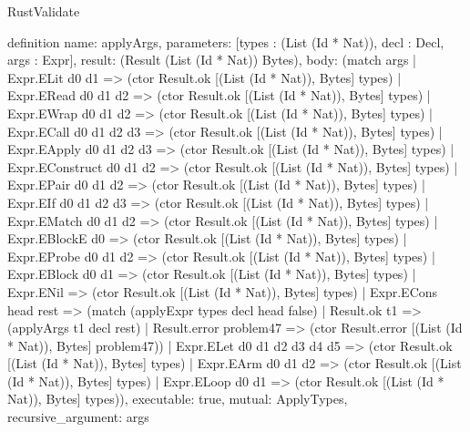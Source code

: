 \begin{lexlean}{RustValidate}
\begin{semanticmodule}
definition{
  name: applyArgs,
  parameters: [types : (List (Id * Nat)), decl : Decl, args : Expr],
  result: (Result (List (Id * Nat)) Bytes),
  body: (match args
    | Expr.ELit d0 d1 => (ctor Result.ok [(List (Id * Nat)), Bytes] types)
    | Expr.ERead d0 d1 d2 => (ctor Result.ok [(List (Id * Nat)), Bytes] types)
    | Expr.EWrap d0 d1 d2 => (ctor Result.ok [(List (Id * Nat)), Bytes] types)
    | Expr.ECall d0 d1 d2 d3 => (ctor Result.ok [(List (Id * Nat)), Bytes] types)
    | Expr.EApply d0 d1 d2 d3 => (ctor Result.ok [(List (Id * Nat)), Bytes] types)
    | Expr.EConstruct d0 d1 d2 => (ctor Result.ok [(List (Id * Nat)), Bytes] types)
    | Expr.EPair d0 d1 d2 => (ctor Result.ok [(List (Id * Nat)), Bytes] types)
    | Expr.EIf d0 d1 d2 d3 => (ctor Result.ok [(List (Id * Nat)), Bytes] types)
    | Expr.EMatch d0 d1 d2 => (ctor Result.ok [(List (Id * Nat)), Bytes] types)
    | Expr.EBlockE d0 => (ctor Result.ok [(List (Id * Nat)), Bytes] types)
    | Expr.EProbe d0 d1 d2 => (ctor Result.ok [(List (Id * Nat)), Bytes] types)
    | Expr.EBlock d0 d1 => (ctor Result.ok [(List (Id * Nat)), Bytes] types)
    | Expr.ENil => (ctor Result.ok [(List (Id * Nat)), Bytes] types)
    | Expr.ECons head rest => (match (applyExpr types decl head false)
      | Result.ok t1 => (applyArgs t1 decl rest)
      | Result.error problem47 => (ctor Result.error [(List (Id * Nat)), Bytes] problem47))
    | Expr.ELet d0 d1 d2 d3 d4 d5 => (ctor Result.ok [(List (Id * Nat)), Bytes] types)
    | Expr.EArm d0 d1 d2 => (ctor Result.ok [(List (Id * Nat)), Bytes] types)
    | Expr.ELoop d0 d1 => (ctor Result.ok [(List (Id * Nat)), Bytes] types)),
  executable: true,
  mutual: ApplyTypes,
  recursive_argument: args
}


\end{semanticmodule}
\end{lexlean}
